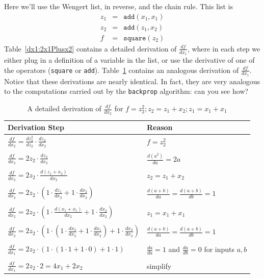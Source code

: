 \documentclass[12pt]{article}
\newcommand{\cd}[1]{\texttt{#1}}
\newcommand{\deriv}[2]{\frac{d{}#1}{d{}#2}}
\begin{document}
Here we'll use the Wengert list, in reverse, and the chain rule.  This
list is
\begin{eqnarray*}
z_1 & = & \cd{add}(x_1,x_1) \\
z_2 & = & \cd{add}(z_1,x_2) \\
f & = & \cd{square}(z_2)
\end{eqnarray*}
Table~\ref{dx1:2x1Plusx2} contains a detailed derivation of
$\deriv{f}{x_1}$, where in each step we either plug in a definition of
a variable in the list, or use the derivative of one of the operators
(\cd{square} or \cd{add}). Table~\ref{dx2:2x1Plusx2} contains an
analogous derivation of $\deriv{f}{x_1}$.  Notice that these
derivations are nearly identical.  In fact, they are very analogous to
the computations carried out by the \cd{backprop} algorithm: can you
see how?

\begin{table}
\begin{tabular}{l|l}
Derivation Step & Reason \\
\hline
\( \deriv{f}{x_2}  =  \deriv{z_2^2}{z_2} \cdot \deriv{z_2}{x_2} \)
         & $f=z_2^2$ \\
& \\
\( \deriv{f}{x_2}  =  2 z_2 \cdot \deriv{z_2}{x_2} \)
         & $\deriv{(a^2)}{a} = 2a$ \\
& \\
\( \deriv{f}{x_2}  =  2 z_2 \cdot \deriv{(z_1 + x_2)}{x_2} \)
         & $z_2 = z_1 + x_2$ \\
& \\
\( \deriv{f}{x_2}  =  2 z_2 \cdot \left( 1 \cdot \deriv{z_1}{x_2} + 1 \cdot \deriv{x_2}{x_2} \right) \)
         & $\deriv{(a+b)}{a} = \deriv{(a+b)}{b} = 1$ \\
& \\
\( \deriv{f}{x_2}  =  2 z_2 \cdot \left( 1 \cdot \deriv{(x_1 + x_1)}{x_2} + 1 \cdot \deriv{x_2}{x_2} \right) \)
         & $z_1 = x_1 + x_1$ \\
& \\
\( \deriv{f}{x_2}  =  2 z_2 \cdot \left( 1 \cdot \left( 1 \cdot \deriv{x_2}{x_2} + 1 \cdot \deriv{x_1}{x_2} \right) + 1 \cdot \deriv{x_2}{x_2} \right) \)
         & $\deriv{(a+b)}{a} = \deriv{(a+b)}{b} = 1$ \\
& \\
\( \deriv{f}{x_1}  =  2 z_2 \cdot \left( 1 \cdot \left( 1 \cdot 1 + 1 \cdot 0 \right) + 1 \cdot 1 \right) \)
         & $\deriv{a}{a}=1$ and $\deriv{a}{b}=0$ for inputs $a,b$ \\
& \\
\( \deriv{f}{x_1}  =  2 z_2 \cdot 2 = 4 x_1 + 2 x_2 \) 
         & simplify\\
\hline
\end{tabular}
\caption{A detailed derivation of $\deriv{f}{x_2}$ for $f = z_2^2; z_2 = z_1 + x_2; z_1 = x_1 + x_1$}
\label{dx2:2x1Plusx2}
\end{table}
\end{document}
